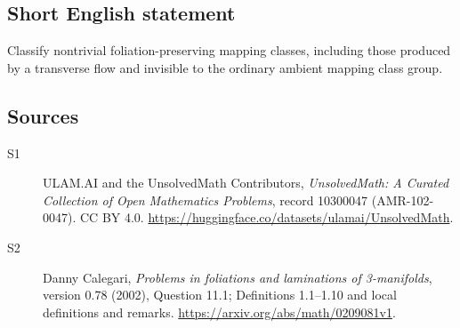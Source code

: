 \documentclass[11pt]{article}
\begin{document}
\subsection{Short English statement}
Classify nontrivial foliation-preserving mapping classes, including those produced by a transverse flow and invisible to the ordinary ambient mapping class group.
\subsection{Sources}
\begin{description}
\item[\hypertarget{source:10300047:1}{S1}] ULAM.AI and the UnsolvedMath Contributors, \emph{UnsolvedMath: A Curated Collection of Open Mathematics Problems}, record 10300047 (AMR-102-0047). CC BY 4.0. \url{https://huggingface.co/datasets/ulamai/UnsolvedMath}.
\item[\hypertarget{source:10300047:2}{S2}] Danny Calegari, \emph{Problems in foliations and laminations of 3-manifolds}, version 0.78 (2002), Question 11.1; Definitions 1.1--1.10 and local definitions and remarks. \url{https://arxiv.org/abs/math/0209081v1}.
\end{description}
\label{end:10300047}
\end{document}
